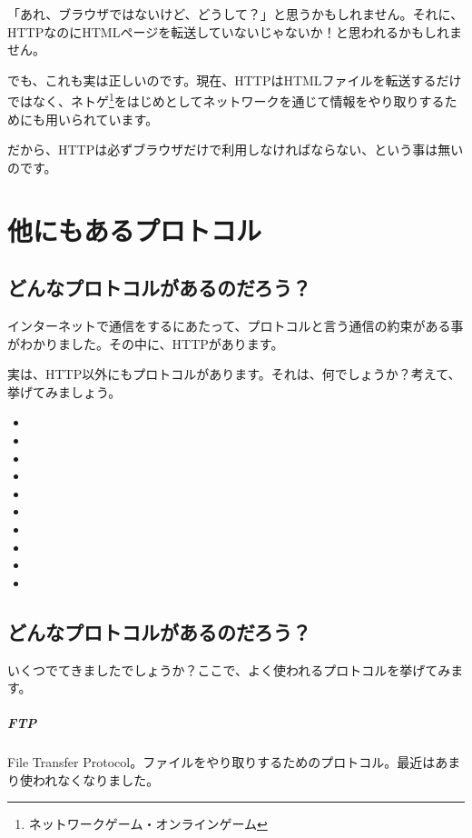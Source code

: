 \documentclass[a4j,11pt,openany]{jsbook}
\begin{document}
「あれ、ブラウザではないけど、どうして？」と思うかもしれません。それに、HTTPなのにHTMLページを転送していないじゃないか！と思われるかもしれません。

でも、これも実は正しいのです。現在、HTTPはHTMLファイルを転送するだけではなく、ネトゲ\footnote{ネットワークゲーム・オンラインゲーム}をはじめとしてネットワークを通じて情報をやり取りするためにも用いられています。

だから、HTTPは必ずブラウザだけで利用しなければならない、という事は無いのです。


\chapter{他にもあるプロトコル}

\section{どんなプロトコルがあるのだろう？}

インターネットで通信をするにあたって、プロトコルと言う通信の約束がある事がわかりました。その中に、HTTPがあります。

実は、HTTP以外にもプロトコルがあります。それは、何でしょうか？考えて、挙げてみましょう。

\begin{HUGE}
    \begin{itemize}
        \item 
        \item 
        \item 
        \item 
        \item 
        \item 
        \item 
        \item 
        \item 
        \item 
    \end{itemize}
\end{HUGE}

\section{どんなプロトコルがあるのだろう？}

いくつでてきましたでしょうか？ここで、よく使われるプロトコルを挙げてみます。

\paragraph{FTP\cite{RFC959}} File Transfer Protocol。ファイルをやり取りするためのプロトコル。最近はあまり使われなくなりました。
\end{document}
